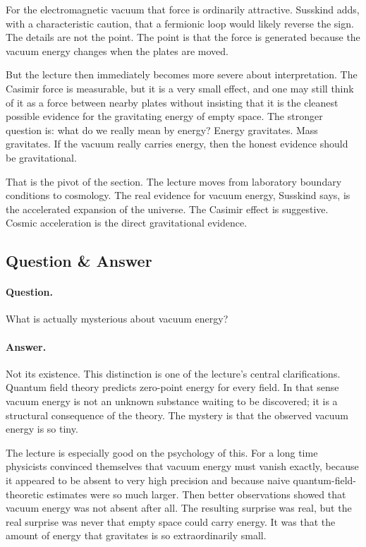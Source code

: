 For the electromagnetic vacuum that force is ordinarily attractive. Susskind adds, with a characteristic caution, that a fermionic loop would likely reverse the sign. The details are not the point. The point is that the force is generated because the vacuum energy changes when the plates are moved.

But the lecture then immediately becomes more severe about interpretation. The Casimir force is measurable, but it is a very small effect, and one may still think of it as a force between nearby plates without insisting that it is the cleanest possible evidence for the gravitating energy of empty space. The stronger question is: what do we really mean by energy? Energy gravitates. Mass gravitates. If the vacuum really carries energy, then the honest evidence should be gravitational.

That is the pivot of the section. The lecture moves from laboratory boundary conditions to cosmology. The real evidence for vacuum energy, Susskind says, is the accelerated expansion of the universe. The Casimir effect is suggestive. Cosmic acceleration is the direct gravitational evidence.

\subsection{Question \& Answer}

\paragraph{Question.} What is actually mysterious about vacuum energy?

\paragraph{Answer.} Not its existence. This distinction is one of the lecture's central clarifications. Quantum field theory predicts zero-point energy for every field. In that sense vacuum energy is not an unknown substance waiting to be discovered; it is a structural consequence of the theory. The mystery is that the observed vacuum energy is so tiny.

The lecture is especially good on the psychology of this. For a long time physicists convinced themselves that vacuum energy must vanish exactly, because it appeared to be absent to very high precision and because naive quantum-field-theoretic estimates were so much larger. Then better observations showed that vacuum energy was not absent after all. The resulting surprise was real, but the real surprise was never that empty space could carry energy. It was that the amount of energy that gravitates is so extraordinarily small.


